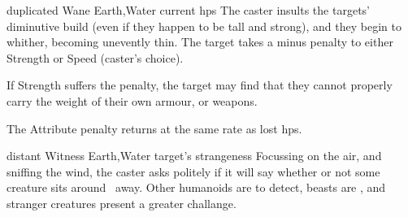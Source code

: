   {duplicated}%
  {Wane}%
  {Earth,Water}%
  {current \glspl{hp}}%
  {The caster insults the targets' diminutive build (even if they happen to be tall and strong), and they begin to whither, becoming unevently thin.
    The target takes a minus  penalty to either Strength or Speed (caster's choice).}%
  {If Strength suffers the penalty, the target may find that they cannot properly carry the weight of their own armour, or weapons.

    The Attribute penalty returns at the same rate as lost \glspl{hp}.}

  {distant}%
  {Witness}%
  {Earth,Water}%
  {target's strangeness}%
  {Focussing on the air, and sniffing the wind, the caster asks politely if it will say whether or not some creature sits around \spellRange\ away.}%
  {Other humanoids are \tn[7] to detect, beasts are \tn[9], and stranger creatures present a greater challange.}
